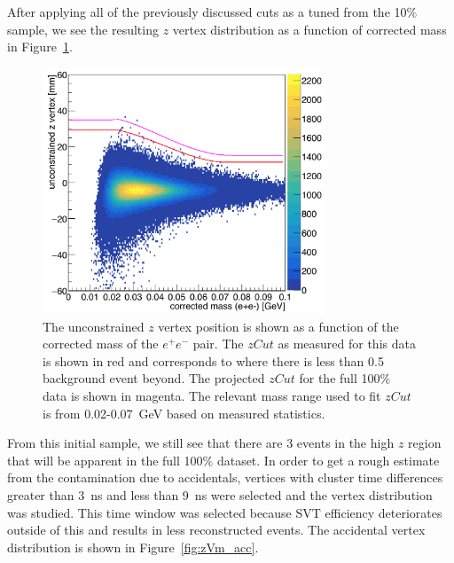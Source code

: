 After applying all of the previously discussed cuts as a tuned from the 10$\%$ sample, we see the resulting $z$ vertex distribution as a function of corrected mass in Figure~\ref{fig:zVm_bl}.

\begin{figure}[htb]
  \centering
      \includegraphics[width=0.75\textwidth]{pics/searching/zVm_bl_L1L1.png}
  \caption[Vertex position vs mass for the 10$\%$ L1L1 data]{The unconstrained $z$ vertex position is shown as a function of the corrected mass of the $e^+e^-$ pair. The $zCut$ as measured for this data is shown in red and corresponds to where there is less than 0.5 background event beyond. The projected $zCut$ for the full 100$\%$ data is shown in magenta. The relevant mass range used to fit $zCut$ is from 0.02-0.07~GeV based on measured statistics.}
  \label{fig:zVm_bl}
\end{figure} 

From this initial sample, we still see that there are 3 events in the high $z$ region that will be apparent in the full 100$\%$ dataset. In order to get a rough estimate from the contamination due to accidentals, vertices with cluster time differences greater than 3~ns and less than 9~ns were selected and the vertex distribution was studied. This time window was selected because SVT efficiency deteriorates outside of this and results in less reconstructed events. The accidental vertex distribution is shown in Figure~\ref{fig:zVm_acc}.

